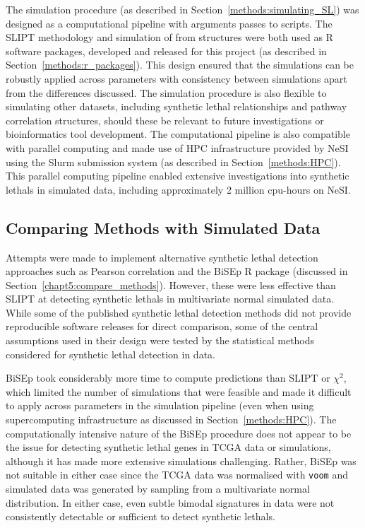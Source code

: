 The simulation procedure (as described in Section~\ref{methods:simulating_SL}) was designed as a computational pipeline with arguments passes to scripts. The \gls{SLIPT} methodology and simulation of  from  structures were both used as R \citep{R_core} software packages, developed and released for this project (as described in Section~\ref{methods:r_packages}). This design ensured that the simulations can be robustly applied across parameters with consistency between simulations apart from the differences discussed. The simulation procedure is also flexible to simulating other datasets, including \gls{synthetic lethal} relationships and pathway correlation structures, should these be relevant to future investigations or \gls{bioinformatics} tool development. The computational pipeline is also compatible with parallel computing and made use of \gls{HPC} infrastructure provided by \gls{NeSI} using the \gls{Slurm} submission system (as described in Section~\ref{methods:HPC}). This parallel computing pipeline enabled extensive investigations into \glspl{synthetic lethal} in simulated data, including approximately 2 million cpu-hours on \gls{NeSI}. 


\subsection{Comparing Methods with Simulated Data}

Attempts were made to implement alternative \gls{synthetic lethal} detection approaches such as Pearson correlation and the \gls{BiSEp} R package (discussed in Section~\ref{chapt5:compare_methods}). However, these were less effective than \gls{SLIPT} at detecting \glspl{synthetic lethal} in multivariate normal simulated data. While some of the published \gls{synthetic lethal} detection methods \citep{Jerby2014, Lu2015} did not provide reproducible software releases for direct comparison, some of the central assumptions used in their design were tested by the statistical methods considered for \gls{synthetic lethal} detection in  data.  

\gls{BiSEp} took considerably more time to compute predictions than \gls{SLIPT} or $\chi^2$, which limited the number of simulations that were feasible and made it difficult to apply across parameters in the simulation pipeline (even when using supercomputing infrastructure as discussed in Section~\ref{methods:HPC}). The computationally intensive nature of the \gls{BiSEp} procedure does not appear to be the issue for detecting \gls{synthetic lethal} genes in \gls{TCGA} data or simulations, although it has made more extensive simulations challenging. Rather, \gls{BiSEp} was not suitable in either case since the \gls{TCGA} data was normalised with \texttt{voom} \citep{limma} and simulated data was generated by sampling from a multivariate normal distribution. In either case, even subtle bimodal signatures in  data were not consistently detectable or sufficient to detect \glspl{synthetic lethal}.

